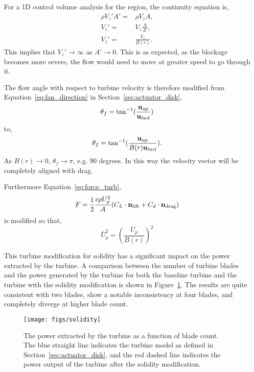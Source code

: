 For a 1D control volume analysis for the region, the continuity
equation is, 
\begin{eqnarray}
 \rho V_z' A' =& \rho V_z A,\\
 V_z' =& V_z \frac{A}{A'}, \\
 V_z' =& \frac{V_z}{B(r)}.
\end{eqnarray}
This implies that $V_z' \rightarrow \infty$ as $A' \rightarrow
0$. This is as expected, as the blockage becomes more severe, the flow
would need to move at greater speed to go through it. 

The flow angle with respect to turbine velocity is therefore modified 
from Equation~\ref{eq:fan_direction} in
Section~\ref{sec:actuator_disk},
\begin{equation}
 \theta_f = \text{tan}^{-1}(\frac{{\bf u_{\text{up}}}}{{\bf u_{\text{fwd}}}})
\end{equation}
to,
\begin{equation}
 \theta_f = \text{tan}^{-1}(\frac{{\bf u_{\text{up}}}}{B(r) {\bf  u_{\text{fwd}}}}). 
\end{equation}
As $B(r) \rightarrow 0$, $\theta_f \rightarrow \pi$, e.g. 90 degrees. In
this way the velocity vector will be completely aligned with drag. 

Furthermore Equation~\ref{eq:force_turb}, 
\begin{equation}
 F = \frac{1}{2}\frac{c \rho U_p^2}{A}(C_L \cdot {\bf n_{\text{lift}}} + C_d
  \cdot {\bf n_{\text{drag}}})
\end{equation}
is modified so that, 
\begin{equation}
 \bar U_p^{2} = \left(\frac{U_p}{B(r)}\right)^2
\end{equation}

This turbine modification for solidity has a significant impact on the
power extracted by the turbine. A comparison between the number of
turbine blades and the power generated by the turbine for both the
baseline turbine and the turbine with the solidity modification is shown in
Figure~\ref{fig:turbine_solidity}. The results are quite consistent with
two blades, show a notable inconsistency at four blades, and completely
diverge at higher blade count. 

  \begin{figure}[!htb]
   \begin{center}
    \texttt{[image: figs/solidity]}
    \caption{The power extracted by the turbine as a function of blade
    count. The blue straight line indicates the turbine model as defined
    in Section~\ref{sec:actuator_disk}, and the red dashed line
    indicates the power output of the turbine after the solidity
    modification.}
    \label{fig:turbine_solidity}
   \end{center}
  \end{figure}

